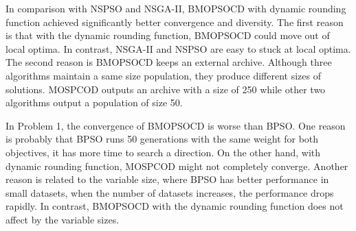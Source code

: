 In comparison with NSPSO and NSGA-II, BMOPSOCD with dynamic rounding function achieved significantly better convergence and diversity. The first reason is that with the dynamic
rounding function, BMOPSOCD could move out of local optima. In contrast, NSGA-II and NSPSO are easy to stuck at local optima. The second reason is BMOPSOCD 
keeps an external archive. Although three algorithms maintain a same size population, they produce different sizes of solutions. 
MOSPCOD outputs an archive with a size of 250 while other two algorithms output a population of size 50.

In Problem 1, the convergence of BMOPSOCD is worse than BPSO. One reason is probably that BPSO runs 50 generations with the same weight for both objectives,
it has more time to search a direction. On the other hand, with dynamic rounding function, MOSPCOD might not completely converge. Another reason is related to 
the variable size, where BPSO has better performance in small datasets, when the number of datasets increases, the performance drops rapidly. In contrast, 
BMOPSOCD with the dynamic rounding function does not affect by the variable sizes.
